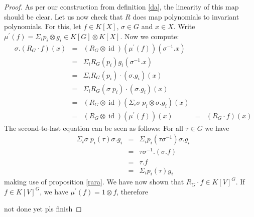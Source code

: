\begin{proof}
  As per our construction from definition \ref{da}, the linearity of this map should be clear.
  Let us now check that $R$ does map polynomials to invariant polynomials.
  For this, let $f \in K[X]$, $\sigma \in G$ and $x \in X$.
  Write $\mu^\prime (f) = \Sigma_i p_i \otimes g_i \in K[G] \otimes K[X] $.
  Now we compute:
  \begin{equation}
    \begin{aligned}
      &\sigma . \left( R_G \cdot f \right) (x)
      &=& \left( R_G \otimes \operatorname{id} \right) \left( \mu^\prime(f) \right) \left( \sigma^{-1}.x \right) \\
      &&=& \Sigma_i R_G \left( p_i \right)  g_i \left( \sigma^{-1} . x \right) \\
      &&=& \Sigma_i R_G (p_i) \cdot (\sigma . g_i) (x)\\
      &&=& \Sigma_i R_G (\sigma \dot{\phantom{.}} p_i) \cdot (\sigma.g_i) (x)\\
      &&=&(R_G \otimes \operatorname{id}) \left( \Sigma_i \sigma \dot{\phantom{.}} p_i \otimes \sigma.g_i \right) (x) \\ 
      &&=& (R_G \otimes \operatorname{id}) (\mu^\prime (f)) (x)
      &=& (R_G \cdot f) (x)
    \end{aligned}
  \end{equation}
  The second-to-last equation can be seen as follows:
  For all $\tau \in G$ we have
  \begin{equation}
    \begin{aligned}
      & \Sigma_i \sigma \dot{\phantom{.}} p_i (\tau) \sigma . g_i
      &=& \Sigma_i  p_i (\tau \sigma^{-1}) \sigma . g_i\\
      &&=& \tau \sigma^{-1} . (\sigma . f) \\
      &&=& \tau . f \\
      &&=& \Sigma_i p_i (\tau) g_i
    \end{aligned}
  \end{equation}
  making use of proposition \ref{rara}.
  We have now shown that $R_G \cdot f \in K[V]^G$.
  If $f \in K[V]^G$, we have $\mu^\prime (f) = 1 \otimes f$, therefore 
  
  not done yet pls finish
\end{proof}
